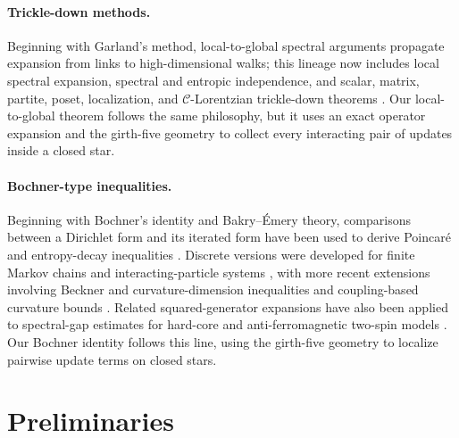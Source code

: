 \documentclass[a4paper,12pt]{article}
\theoremstyle{plain}
\theoremstyle{definition}
\begin{document}
\paragraph{Trickle-down methods.}
Beginning with Garland's method, local-to-global spectral arguments
propagate expansion from links to high-dimensional walks; this lineage now
includes local spectral expansion, spectral and entropic independence, and
scalar, matrix, partite, poset, localization, and $\mathcal C$-Lorentzian
trickle-down theorems
\cite{Garland1973,BallmannSwiatkowski1997,Zuk2003,
ParzanchevskiRosenthal2017,KaufmanMass2017,DinurKaufman2017,
Parzanchevski2017,Oppenheim2018,KaufmanOppenheim2020,Oppenheim2020,
AnariEtAl2019,CryanGuoMousa2021,AlevLau2020,ALO2020,GuoMousa2020,
FGYZ2022,JPV2022,ChenLiuVigoda2021,ALG2021,AnariEtAl2022,
KaufmanTessler2026,
AbdolazimiOveisGharan2023,GotlibKaufman2023,AnariKoehlerVuong2024, ChenEtAl2025RandomRegular,
LeakeLindbergOveisGharan2025,LeakeOveisGharan2025}.  Our local-to-global
theorem follows the same philosophy, but it uses an exact operator expansion
and the girth-five geometry to collect every interacting pair of updates
inside a closed star.

\paragraph{Bochner-type inequalities.}
Beginning with Bochner's identity and Bakry--\'Emery theory, comparisons
between a Dirichlet form and its iterated form have been used to derive
Poincar\'e and entropy-decay inequalities
\cite{Bochner1946,BakryEmery1985,BGL2014}.  Discrete versions were
developed for finite Markov chains and interacting-particle systems
\cite{BCDP2006,CaputoPosta2007,Caputo2008,CDP2009,DaiPraPosta2013,
Maas2011,ErbarMaas2012,Mielke2013,EMT2015,FathiMaas2016,EHMT2017,
ErbarFathi2018}, with more recent extensions involving Beckner and
curvature-dimension inequalities and coupling-based curvature bounds
\cite{JungelYue2017,WeberZacher2021,Pedrotti2025}.  Related
squared-generator expansions have also been applied to spectral-gap
estimates for hard-core and anti-ferromagnetic two-spin models
\cite{KondratievKunaOhlerich2013,GoebelEtAl2026,
GuoZhang2026Planar}.  Our Bochner identity
follows this line, using the girth-five geometry to localize pairwise
update terms on closed stars.

\section{Preliminaries}
\end{document}
